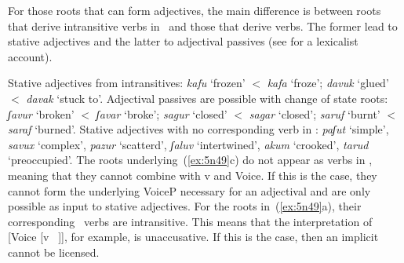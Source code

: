 \begin{exe}
\begin{xlist}
\begin{exe}
\begin{xlist}
\begin{exe}
\begin{exe}
\begin{xlist}
\begin{exe}
\begin{exe}
\begin{xlist}
\begin{exe}
\begin{xlist}
\begin{exe}
\begin{xlist}
\begin{exe}
\begin{xlist}
\begin{exe}
\begin{xlist}
\begin{xlist}
\begin{exe}
\begin{xlist}
\begin{exe}
\begin{xlist}
\begin{exe}
\begin{exe}
\begin{exe}
\begin{xlist}
\begin{exe}
\begin{exe}
\begin{xlist}
\begin{exe}
\begin{xlist}
\begin{exe}
\begin{xlist}
\begin{exe}
\begin{xlist}
\begin{xlist}
\begin{exe}
\begin{xlist}
\begin{exe}
\begin{xlist}
\begin{exe}
\begin{xlist}
\begin{exe}
\begin{xlist}
\begin{exe}
\begin{exe}
\begin{exe}
\begin{exe}
\begin{exe}
\begin{xlist}
\begin{xlist}
\begin{exe}
\begin{xlist}
\begin{exe}
\begin{xlist}
\begin{exe}
\begin{exe}
 \z 

For those roots that can form adjectives, the main difference is between roots that derive intransitive verbs in \tkal~and those that derive  verbs. The former lead to stative adjectives and the latter to adjectival passives (see \citealt{meltzerasscher11} for a lexicalist account).
 \begin{exe}
 \ex   \label{ex:5n49}
 \begin{xlist} 
   \ex  Stative adjectives from intransitives: \emph{kafu} `frozen' $<$ \emph{kafa} `froze'; \emph{davuk} `glued' $<$ \emph{davak} `stuck to'.  
   \ex  Adjectival passives are possible with change of state roots: \emph{ʃavur} `broken' $<$ \emph{ʃavar} `broke'; \emph{sagur} `closed' $<$ \emph{sagar} `closed'; \emph{saruf} `burnt' $<$ \emph{saraf} `burned'.  
   \ex  Stative adjectives with no corresponding verb in \tkal: \emph{paʃut} `simple', \emph{savux} `complex', \emph{pazur} `scatterd', \emph{ʃaluv} `intertwined', \emph{akum} `crooked', \emph{tarud} `preoccupied'. 
   \z
\z 
The roots underlying~(\ref{ex:5n49}c) do not appear as verbs in \tkal, meaning that they cannot combine with v and Voice. If this is the case, they cannot form the underlying VoiceP necessary for an adjectival  and are only possible as input to stative adjectives. For the roots in~(\ref{ex:5n49}a), their corresponding \tkal~verbs are intransitive. This means that the interpretation of [Voice [v ~\!]], for example, is unaccusative. If this is the case, then an implicit  cannot be licensed.




\end{xlist}
\end{exe}
\end{exe}
\end{exe}
\end{xlist}
\end{exe}
\end{xlist}
\end{exe}
\end{xlist}
\end{xlist}
\end{exe}
\end{exe}
\end{exe}
\end{exe}
\end{exe}
\end{xlist}
\end{exe}
\end{xlist}
\end{exe}
\end{xlist}
\end{exe}
\end{xlist}
\end{exe}
\end{xlist}
\end{xlist}
\end{exe}
\end{xlist}
\end{exe}
\end{xlist}
\end{exe}
\end{xlist}
\end{exe}
\end{exe}
\end{xlist}
\end{exe}
\end{exe}
\end{exe}
\end{xlist}
\end{exe}
\end{xlist}
\end{exe}
\end{xlist}
\end{xlist}
\end{exe}
\end{xlist}
\end{exe}
\end{xlist}
\end{exe}
\end{xlist}
\end{exe}
\end{xlist}
\end{exe}
\end{exe}
\end{xlist}
\end{exe}
\end{exe}
\end{xlist}
\end{exe}
\end{xlist}
\end{exe}
